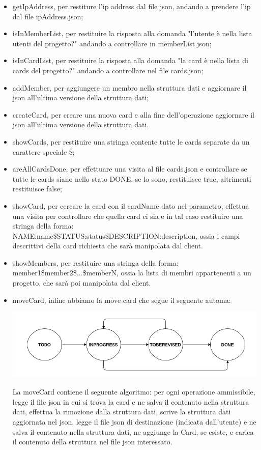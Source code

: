 \documentclass[]{article}
\begin{document}
\begin{itemize}
	\item getIpAddress, per restiture l'ip address dal file json, andando a prendere l'ip dal file ipAddress.json;
	\item isInMemberList, per restituire la risposta alla domanda "l'utente è nella lista utenti del progetto?" andando a controllare in memberList.json;
	\item isInCardList, per restituire la risposta alla domanda "la card è nella lista di cards del progetto?" andando a controllare nel file cards.json;
	\item addMember, per aggiungere un membro nella struttura dati e aggiornare il json all'ultima versione della struttura dati;
	\item createCard, per creare una nuova card e alla fine dell'operazione aggiornare il json all'ultima versione della struttura dati.
	\item showCards, per restituire una stringa contente tutte le cards separate da un carattere speciale \$;
	\item areAllCardsDone, per effettuare una visita al file cards.json e controllare se tutte le cards siano nello stato DONE, se lo sono, restituisce true, altrimenti restituisce false;
	\item showCard, per cercare la card con il cardName dato nel parametro, effettua una visita per controllare che quella card ci sia e in tal caso restituire una stringa della forma:\\
	NAME:name\$STATUS:status\$DESCRIPTION:description,
	ossia i campi descrittivi della card richiesta che sarà manipolata dal client.
	\item showMembers, per restituire una stringa della forma:\\
	member1\$member2\$...\$memberN,
	ossia la lista di membri appartenenti a un progetto, che sarà poi manipolata dal client.
	\item moveCard, infine abbiamo la move card che segue il seguente automa:
	\begin{center}
		\includegraphics[scale=.5]{graphStatus}
	\end{center}
	La moveCard contiene il seguente algoritmo: per ogni operazione ammissibile, legge il file json in cui si trova la card e ne salva il contenuto nella struttura dati, effettua la rimozione dalla struttura dati, scrive la struttura dati aggiornata nel json, legge il file json di destinazione (indicata dall'utente) e ne salva il contenuto nella struttura dati, ne aggiunge la Card, se esiste, e carica il contenuto della struttura nel file json interessato.
\end{itemize}
\end{document}
